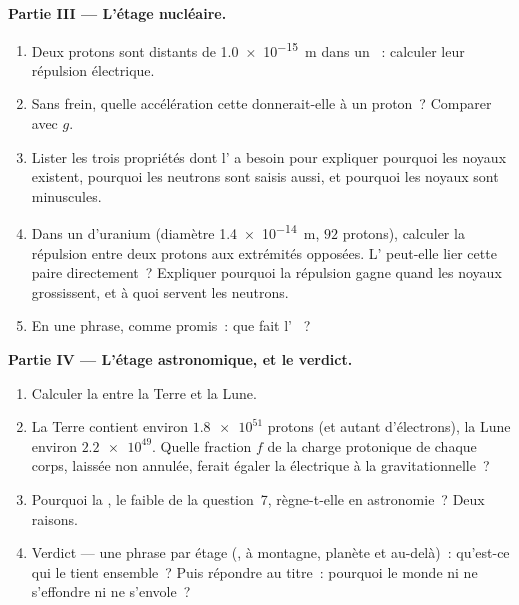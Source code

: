 \begin{problem}
\medskip
\noindent\textbf{Partie III --- L'étage nucléaire.}
\begin{enumerate}[resume]
  \item Deux protons sont distants de \qty{1.0e-15}{m} dans un
        ~: calculer leur répulsion
        électrique.
  \item Sans frein, quelle accélération cette
         donnerait-elle à un proton~?
        Comparer avec $g$.
  \item Lister les trois propriétés dont l'
         a besoin pour
        expliquer pourquoi les noyaux existent, pourquoi les neutrons
        sont saisis aussi, et pourquoi les noyaux sont minuscules.
  \item Dans un  d'uranium (diamètre
        \qty{1.4e-14}{m}, $92$ protons), calculer la répulsion entre
        deux protons aux extrémités opposées. L'
         peut-elle lier
        cette paire directement~? Expliquer pourquoi la répulsion gagne
        quand les noyaux grossissent, et à quoi servent les neutrons.
  \item En une phrase, comme promis~: que fait l'
        ~?
\end{enumerate}

\medskip
\noindent\textbf{Partie IV --- L'étage astronomique, et le verdict.}
\begin{enumerate}[resume]
  \item Calculer la 
        entre la Terre et la Lune.
  \item La Terre contient environ $\num{1.8e51}$ protons (et autant
        d'électrons), la Lune environ $\num{2.2e49}$. Quelle fraction
        $f$ de la charge protonique de chaque corps, laissée
        non annulée, ferait égaler la
         électrique à la gravitationnelle~?
  \item Pourquoi la , le faible
        de la question~7, règne-t-elle en astronomie~? Deux raisons.
  \item Verdict --- une phrase par étage
        (,
         à montagne, planète et
        au-delà)~: qu'est-ce qui le tient ensemble~? Puis répondre au
        titre~: pourquoi le monde ni ne s'effondre ni ne s'envole~?
\end{enumerate}
\end{problem}
